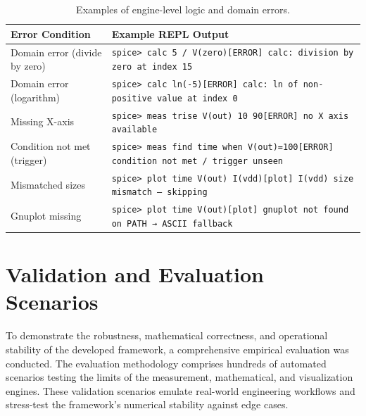 \begin{table}[H]
    \centering
    \caption{Examples of engine-level logic and domain errors.}
    \label{tab:err_engines}
    \renewcommand{\arraystretch}{1.3}
    \begin{tabularx}{\textwidth}{@{} >{\raggedright\arraybackslash}p{4.2cm} >{\raggedright\arraybackslash}X @{}}
        \toprule
        \textbf{Error Condition} & \textbf{Example REPL Output} \\
        \midrule
        Domain error (divide by zero)
        & \texttt{spice> calc 5 / V(zero)}\newline \texttt{[ERROR] calc: division by zero at index 15} \\
        Domain error (logarithm)
        & \texttt{spice> calc ln(-5)}\newline \texttt{[ERROR] calc: ln of non-positive value at index 0} \\
        \midrule
        Missing X-axis 
        & \texttt{spice> meas trise V(out) 10 90}\newline \texttt{[ERROR] no X axis available} \\
        Condition not met (trigger)
        & \texttt{spice> meas find time when V(out)=100}\newline \texttt{[ERROR] condition not met / trigger unseen} \\
        \midrule
        Mismatched sizes 
        & \texttt{spice> plot time V(out) I(vdd)}\newline \texttt{[plot] I(vdd) size mismatch — skipping} \\
        Gnuplot missing 
        & \texttt{spice> plot time V(out)}\newline \texttt{[plot] gnuplot not found on PATH → ASCII fallback} \\
        \bottomrule
    \end{tabularx}
\end{table}


\section{Validation and Evaluation Scenarios}
\label{sec:pp-verification}

To demonstrate the robustness, mathematical correctness, and operational stability of the developed framework, a comprehensive empirical evaluation was conducted. The evaluation methodology comprises hundreds of automated scenarios testing the limits of the measurement, mathematical, and visualization engines. These validation scenarios emulate real-world engineering workflows and stress-test the framework's numerical stability against edge cases.

